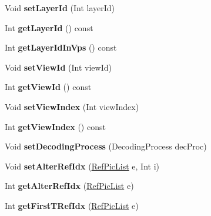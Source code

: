 \begin{DoxyCompactItemize}
Void {\bfseries set\+Layer\+Id} (Int layer\+Id)
\item 
\mbox{\label{class_t_com_slice_a02be4220f74ee727431d7a53a8bce533}} 
Int {\bfseries get\+Layer\+Id} () const
\item 
\mbox{\label{class_t_com_slice_a602c6c86f6b3654e78a716e722ed534e}} 
Int {\bfseries get\+Layer\+Id\+In\+Vps} () const
\item 
\mbox{\label{class_t_com_slice_a1030920ee617b14ae7e15abc2393f3a2}} 
Void {\bfseries set\+View\+Id} (Int view\+Id)
\item 
\mbox{\label{class_t_com_slice_a80728df1b935d7b0c8c4c0614c723d4b}} 
Int {\bfseries get\+View\+Id} () const
\item 
\mbox{\label{class_t_com_slice_a5791c46c7999398a4e3f98b4e222de0c}} 
Void {\bfseries set\+View\+Index} (Int view\+Index)
\item 
\mbox{\label{class_t_com_slice_ae7793f57bec6d5068e9247919c3530e3}} 
Int {\bfseries get\+View\+Index} () const
\item 
\mbox{\label{class_t_com_slice_a6a54783f4b324ce1760062b0c952ea96}} 
Void {\bfseries set\+Decoding\+Process} (Decoding\+Process dec\+Proc)
\item 
\mbox{\label{class_t_com_slice_adad6b57230fa2065babd33c47e38b5fb}} 
Void {\bfseries set\+Alter\+Ref\+Idx} (\hyperlink{_type_def_8h_a93cea48eb9dcfd661168dee82e41b384}{Ref\+Pic\+List} e, Int i)
\item 
\mbox{\label{class_t_com_slice_a15c9b6dd4dc5167f44ba361f6e97ced9}} 
Int {\bfseries get\+Alter\+Ref\+Idx} (\hyperlink{_type_def_8h_a93cea48eb9dcfd661168dee82e41b384}{Ref\+Pic\+List} e)
\item 
\mbox{\label{class_t_com_slice_aff0fe3dd89bed16de9e92e7971c89aa0}} 
Int {\bfseries get\+First\+T\+Ref\+Idx} (\hyperlink{_type_def_8h_a93cea48eb9dcfd661168dee82e41b384}{Ref\+Pic\+List} e)
\item 
\mbox{\label{class_t_com_slice_a82d8f41eed85b7ea524157d9fb9f51bc}} 

\end{DoxyCompactItemize}
